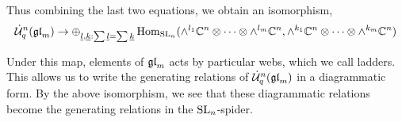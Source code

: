 \documentclass[10pt,leqno]{article}
\begin{document}
Thus combining the last two equations, we obtain an isomorphism,
\begin{equation*}
\dot{{\mathcal{U}}}_q^n({\mathfrak{gl}}_m) \rightarrow \oplus_{{\underline{l}}, {\underline{k}} : \sum {\underline{l}} = \sum {\underline{k}}} \operatorname{Hom}_{{\rm{SL}}_n}(\wedge^{l_1} \mathbb C^n \otimes \cdots \otimes \wedge^{l_m} \mathbb C^n, \wedge^{k_1} \mathbb C^n \otimes \cdots \otimes \wedge^{k_m} \mathbb C^n)
\end{equation*}

Under this map, elements of ${\mathfrak{gl}}_m $ acts by particular webs, which we call ladders.  This allows us to write the generating relations of $ \dot{{\mathcal{U}}}_q^n({\mathfrak{gl}}_m) $ in a diagrammatic form.  By the above isomorphism, we see that these diagrammatic relations become the generating relations in the $ {\rm{SL}}_n $-spider.




\end{document}

